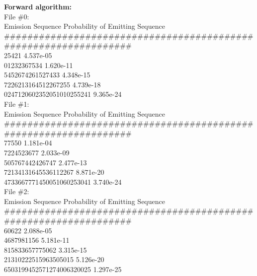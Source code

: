 \begin{solution}
  \textbf{Forward algorithm:}\\
  File \#0:\\
  Emission Sequence             Probability of Emitting Sequence\\
  \footnotesize \#\#\#\#\#\#\#\#\#\#\#\#\#\#\#\#\#\#\#\#\#\#\#\#\#\#\#\#\#\#\#\#\#\#\#\#\#\#\#\#\#\#\#\#\#\#\#\#\#\#\#\#\#\#\#\#\#\#\#\#\#\#\#\#\#\\
  25421                         4.537e-05 \\
  01232367534                   1.620e-11 \\
  5452674261527433              4.348e-15 \\
  7226213164512267255           4.739e-18 \\
  0247120602352051010255241     9.365e-24 \\
  
  File \#1:\\
  Emission Sequence             Probability of Emitting Sequence\\
  \footnotesize \#\#\#\#\#\#\#\#\#\#\#\#\#\#\#\#\#\#\#\#\#\#\#\#\#\#\#\#\#\#\#\#\#\#\#\#\#\#\#\#\#\#\#\#\#\#\#\#\#\#\#\#\#\#\#\#\#\#\#\#\#\#\#\#\#\\
  77550                         1.181e-04 \\
  7224523677                    2.033e-09 \\
  505767442426747               2.477e-13 \\
  72134131645536112267          8.871e-20 \\
  4733667771450051060253041     3.740e-24 \\
  
  File \#2:\\
  Emission Sequence             Probability of Emitting Sequence\\
  \footnotesize \#\#\#\#\#\#\#\#\#\#\#\#\#\#\#\#\#\#\#\#\#\#\#\#\#\#\#\#\#\#\#\#\#\#\#\#\#\#\#\#\#\#\#\#\#\#\#\#\#\#\#\#\#\#\#\#\#\#\#\#\#\#\#\#\#\\
  60622                         2.088e-05 \\
  4687981156                    5.181e-11 \\
  815833657775062               3.315e-15 \\
  21310222515963505015          5.126e-20 \\
  6503199452571274006320025     1.297e-25 \\
  

\end{solution}
